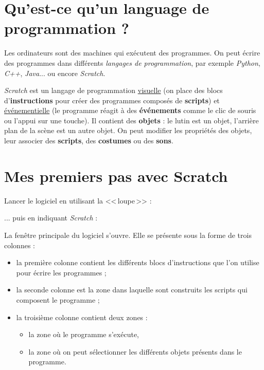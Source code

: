 \section{Qu'est-ce qu'un language de programmation ?} 

Les ordinateurs sont des machines qui exécutent des programmes. On peut écrire des programmes dans différents \emph{langages de programmation}, par exemple \emph{Python}, \emph{C++}, \emph{Java}... ou encore \emph{Scratch}.

\emph{Scratch} est un langage de programmation \underline{visuelle} (on place des blocs d'\textbf{instructions} pour créer des programmes composés de \textbf{scripts}) et \underline{événementielle} (le programme réagit à des \textbf{événements} comme le clic de souris ou l'appui sur une touche). Il contient des \textbf{objets} : le lutin est un objet, l'arrière plan de la scène est un autre objet. On peut modifier les propriétés des objets, leur associer des \textbf{scripts}, des \textbf{costumes} ou des \textbf{sons}.   



\section{Mes premiers pas avec Scratch}

Lancer le logiciel en utilisant la <<\,loupe\,>> :


... puis en indiquant \emph{Scratch} :



La fenêtre principale du logiciel s'ouvre. Elle se présente sous la forme de trois colonnes :

\begin{itemize}
\item la première colonne contient les différents blocs d'instructions que l'on utilise pour écrire les programmes ;
\item la seconde colonne est la zone dans laquelle sont construits les scripts qui composent le programme ;
\item la troisième colonne contient deux zones :
        \begin{itemize}
        \item la zone où le programme s'exécute,
        \item la zone où on peut sélectionner les différents objets présents dans le programme.
        \end{itemize}
\end{itemize}

